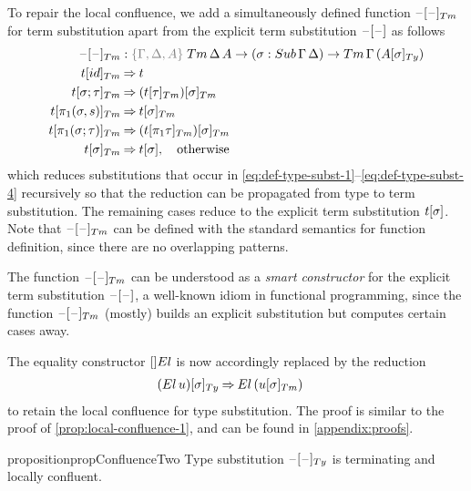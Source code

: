 \documentclass[a4paper,UKenglish,numberwithinsect,cleveref,thm-restate]{lipics-v2021}
\newcommand{\danger}{\marginpar[\hfill\dbend]{\dbend\hfill}}
\begin{document}
To repair the local confluence, we add a simultaneously defined function $\subTm{\blank}{\blank}$ for term substitution apart from the explicit term substitution ${{\mathord{\hspace{1pt}\text{--}\hspace{1pt}}}[ \mathord{\hspace{1pt}\text{--}\hspace{1pt}} ]}$ as follows
\begin{alignat*}{3}
  \subTm{\blank}{\blank} & : \implicit{\Gamma, \Delta, A}\;\Tm\,\Delta\,A \to (\sigma : \Sub\,\Gamma\,\Delta) \to \Tm\,\Gamma\,(\subTy{A}{\sigma}) \\
\subTm{t}{\idS}          & \reduce t \\
\subTm{t}{\sigma ; \tau} & \reduce \subTm{(\subTm{t}{\tau})}{\sigma} \\
\subTm{t}{\pi_1(\sigma, s)} & \reduce \subTm{t}{\sigma} \\
\subTm{t}{\pi_1(\sigma; \tau)} & \reduce \subTm{(\subTm{t}{\pi_1\tau})}{\sigma} \\
\subTm{t}{\sigma}        & \reduce \sub{t}{\sigma}, \quad \text{otherwise}
\end{alignat*}
which reduces substitutions that occur in \eqref{eq:def-type-subst-1}--\eqref{eq:def-type-subst-4} recursively so that the reduction can be propagated from type to term substitution.
The remaining cases reduce to the explicit term substitution ${{t}[ \sigma ]}$.
Note that $\subTm{\blank}{\blank}$ can be defined with the standard semantics for function definition, since there are no overlapping patterns.
\begin{remark}
  The function $\subTm{\blank}{\blank}$ can be understood as a \emph{smart constructor} for the explicit term substitution ${{\mathord{\hspace{1pt}\text{--}\hspace{1pt}}}[ \mathord{\hspace{1pt}\text{--}\hspace{1pt}} ]}$, a well-known idiom in functional programming, since the function $\subTm{\blank}{\blank}$ (mostly) builds an explicit substitution but computes certain cases away.
\end{remark}

The equality constructor $[]\El$ is now accordingly replaced by the reduction
\begin{align}
  \subTy{(\El\, u)}{\sigma} & \reduce \El\,(\subTm{u}{\sigma}) \label{eq:def-type-subst-7}
\end{align}
to retain the local confluence for type substitution. The proof is similar to the proof of \cref{prop:local-confluence-1}, and can be found in \cref{appendix:proofs}.
\begin{restatable}{proposition}{propConfluenceTwo}\label{prop:local-confluence-2}
  Type substitution $\subTy{\blank}{\blank}$ is terminating and locally confluent.
  \danger
\end{restatable}
\end{document}
